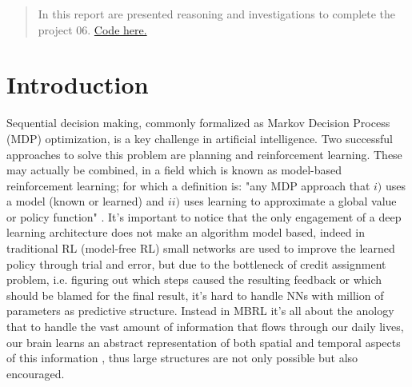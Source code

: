 \documentclass{article}
\begin{document}

\printAffiliationsAndNotice{}

\begin{abstract}
%
In this report are presented reasoning and investigations to complete the project 06.
\href{https://github.com/DennisRotondi/dlai_project}{Code here.}

\end{abstract}

\section{Introduction}
Sequential decision making, commonly formalized as Markov Decision Process (MDP) optimization, is a key challenge in artificial intelligence. Two successful approaches to solve this problem are planning
and reinforcement learning. These may actually
be combined, in a field which is known as model-based reinforcement learning; for which a definition is: "any MDP approach that $i)$ uses a model (known or learned) and $ii)$
uses learning to approximate a global value or policy function" \cite{mb_survey}.
It's important to notice that the only engagement of a deep learning architecture does not make an algorithm model based, indeed in 
traditional RL (model-free RL) small networks are used to improve the learned policy through trial and error, but due to the bottleneck of credit assignment problem, i.e. figuring out which steps caused the resulting feedback or which should be blamed for the final result, it's hard to handle
NNs with million of parameters as predictive structure. Instead in MBRL it's all about the anology that to handle the vast amount of information that flows through our daily lives, our brain learns an abstract representation of both spatial and temporal aspects of this information \cite{brain_article}, thus large structures are not only possible but also encouraged.%
\end{document}
